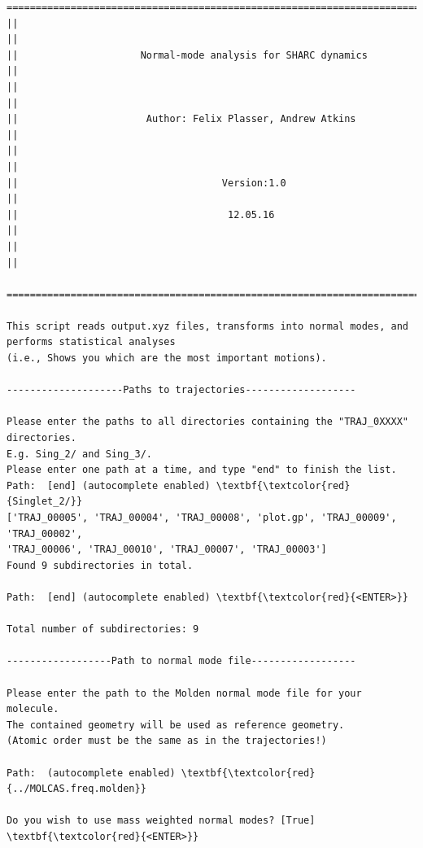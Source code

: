 \documentclass[a4paper,11pt,DIV=15,openany]{scrbook}
\begin{document}
\begin{oframed}
\footnotesize\begin{Verbatim}[commandchars=\\\{\}]
  ================================================================================
||                                                                                ||
||                     Normal-mode analysis for SHARC dynamics                    ||
||                                                                                ||
||                      Author: Felix Plasser, Andrew Atkins                      ||
||                                                                                ||
||                                   Version:1.0                                  ||
||                                    12.05.16                                    ||
||                                                                                ||
  ================================================================================

This script reads output.xyz files, transforms into normal modes, and performs statistical analyses 
(i.e., Shows you which are the most important motions).
  
--------------------Paths to trajectories-------------------

Please enter the paths to all directories containing the "TRAJ_0XXXX" directories.
E.g. Sing_2/ and Sing_3/. 
Please enter one path at a time, and type "end" to finish the list.
Path:  [end] (autocomplete enabled) \textbf{\textcolor{red}{Singlet_2/}}
['TRAJ_00005', 'TRAJ_00004', 'TRAJ_00008', 'plot.gp', 'TRAJ_00009', 'TRAJ_00002', 
'TRAJ_00006', 'TRAJ_00010', 'TRAJ_00007', 'TRAJ_00003']
Found 9 subdirectories in total.

Path:  [end] (autocomplete enabled) \textbf{\textcolor{red}{<ENTER>}}

Total number of subdirectories: 9

------------------Path to normal mode file------------------

Please enter the path to the Molden normal mode file for your molecule. 
The contained geometry will be used as reference geometry.
(Atomic order must be the same as in the trajectories!)

Path:  (autocomplete enabled) \textbf{\textcolor{red}{../MOLCAS.freq.molden}}

Do you wish to use mass weighted normal modes? [True] \textbf{\textcolor{red}{<ENTER>}}


\end{Verbatim}
\end{oframed}
\end{document}
